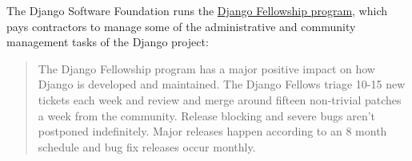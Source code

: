 \begin{kaobox}[frametitle=Django Fellowship Program]

The Django Software Foundation runs the \href{https://www.djangoproject.com/fundraising/#fellowship-program}{Django Fellowship program}, which pays contractors to manage some of the administrative and community management tasks of the Django project:

\begin{quote}

The Django Fellowship program has a major positive impact on how Django is developed and maintained. The Django Fellows triage 10-15 new tickets each week and review and merge around fifteen non-trivial patches a week from the community. Release blocking and severe bugs aren't postponed indefinitely. Major releases happen according to an 8 month schedule and bug fix releases occur monthly.

\end{quote}

\end{kaobox}

